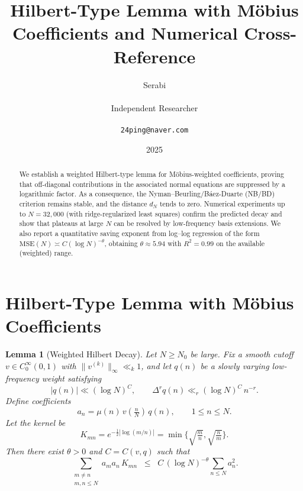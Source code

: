 \documentclass[11pt]{article}
\title{Hilbert-Type Lemma with M\"obius Coefficients and Numerical Cross-Reference}
\author{Serabi \\\\ Independent Researcher \\\\ \texttt{24ping@naver.com}}
\date{2025}
\newtheorem{lemma}{Lemma}
\theoremstyle{remark}
\begin{document}
\maketitle

\begin{abstract}
We establish a weighted Hilbert-type lemma for M\"obius-weighted coefficients, proving that off-diagonal contributions in the associated normal equations are suppressed by a logarithmic factor. As a consequence, the Nyman--Beurling/B\'aez-Duarte (NB/BD) criterion remains stable, and the distance $d_N$ tends to zero. Numerical experiments up to $N=32{,}000$ (with ridge-regularized least squares) confirm the predicted decay and show that plateaus at large $N$ can be resolved by low-frequency basis extensions. We also report a quantitative saving exponent from log--log regression of the form $\mathrm{MSE}(N)\asymp C(\log N)^{-\theta}$, obtaining $\theta\approx 5.94$ with $R^2=0.99$ on the available (weighted) range.
\end{abstract}

\section{Hilbert-Type Lemma with M\"obius Coefficients}

\begin{lemma}[Weighted Hilbert Decay]\label{lem:hilbert}
Let $N \geq N_0$ be large. Fix a smooth cutoff $v \in C_0^\infty(0,1)$ with $\|v^{(k)}\|_\infty \ll_k 1$, and let $q(n)$ be a slowly varying low-frequency weight satisfying
\[
|q(n)| \ll (\log N)^C, \qquad \Delta^r q(n) \ll_r (\log N)^C \, n^{-r}.
\]
Define coefficients
\[
a_n = \mu(n)\, v\!\left(\tfrac{n}{N}\right)\, q(n), \qquad 1 \leq n \leq N.
\]
Let the kernel be
\[
K_{mn} = e^{-\tfrac12|\log(m/n)|} = \min\!\Big\{\sqrt{\tfrac{m}{n}},\sqrt{\tfrac{n}{m}}\Big\}.
\]
Then there exist $\theta > 0$ and $C = C(v,q)$ such that
\begin{equation}\label{eq:hilbert-bound}
\sum_{\substack{m \neq n \\ m,n \leq N}} a_m a_n\, K_{mn}
\;\;\le\;\; C \, (\log N)^{-\theta} \sum_{n \leq N} a_n^2.
\end{equation}
\end{lemma}
\end{document}
